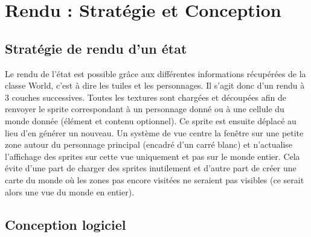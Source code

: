 \documentclass[a4paper,12pt]{article}
\begin{document}
\clearpage
\section{Rendu : Stratégie et Conception}

\subsection{Stratégie de rendu d’un état}
Le rendu de l'état est possible grâce aux différentes informations récupérées de la classe World, c'est à dire les tuiles et les personnages. Il s'agit donc d'un rendu à 3 couches successives. Toutes les textures sont chargées et découpées afin de renvoyer le sprite correspondant à un personnage donné ou à une cellule du monde donnée (élément et contenu optionnel). Ce sprite est ensuite déplacé au lieu d'en générer un nouveau. Un système de vue centre la fenêtre sur une petite zone autour du personnage principal (encadré d'un carré blanc) et n'actualise l'affichage des sprites sur cette vue uniquement et pas sur le monde entier. Cela évite d'une part de charger des sprites inutilement et d'autre part de créer une carte du monde où les zones pas encore visitées ne seraient pas visibles (ce serait alors une vue du monde en entier).


\subsection{Conception logiciel}
\end{document}
